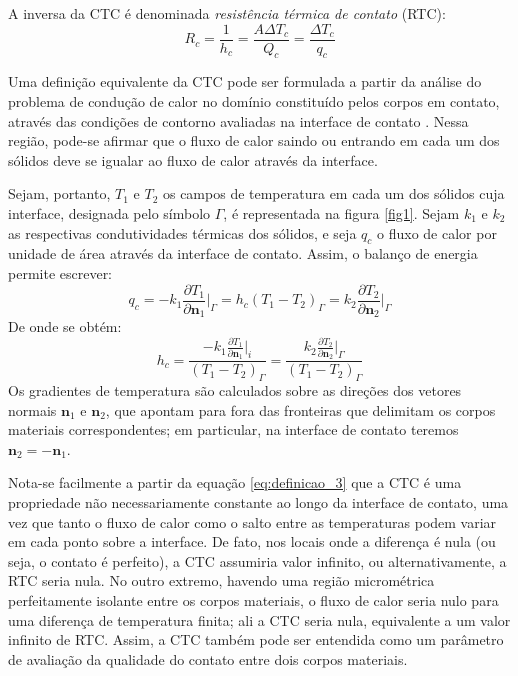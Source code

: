 A inversa da CTC é denominada \textit{resistência térmica de contato} (RTC):
\begin{equation}
	R_c = \frac{1}{h_c} = \frac{A\Delta T_c}{Q_c} = \frac{\Delta T_c}{q_c}
\end{equation}

Uma definição equivalente da CTC pode ser formulada a partir da análise do problema de condução de calor no domínio constituído pelos
corpos em contato, através das condições de contorno avaliadas na interface de contato \citep{livro_ozisik}. Nessa região, pode-se afirmar que o fluxo
de calor saindo ou entrando em cada um dos sólidos deve se igualar ao fluxo de calor através da interface.

Sejam, portanto, $T_1$ e $T_2$ os campos de temperatura em cada um dos sólidos cuja interface, designada pelo símbolo $\Gamma$, é representada na figura \ref{fig1}. Sejam $k_1$ e $k_2$
as respectivas condutividades térmicas dos sólidos, e seja $q_c$ o fluxo de calor por unidade de área através da interface de contato. Assim, o balanço de energia permite escrever:
\begin{equation}
	q_c = -k_1\frac{\partial T_1}{\partial \mathbf{n}_1}\bigg|_\Gamma
	=
	h_c(T_1 - T_2)_\Gamma
	=
	k_2\frac{\partial T_2}{\partial \mathbf{n}_2}\bigg|_\Gamma \label{eq:definicao_2}
\end{equation}
De onde se obtém:
\begin{equation}
	h_c = \frac{-k_1\displaystyle\frac{\partial T_1}{\partial \mathbf{n}_1}\bigg|_i}{(T_1 - T_2)_\Gamma} = \frac{k_2\displaystyle\frac{\partial T_2}{\partial \mathbf{n}_2}\bigg|_\Gamma}{(T_1 - T_2)_\Gamma} \label{eq:definicao_3}
\end{equation}
Os gradientes de temperatura são calculados sobre as direções dos vetores normais
$\mathbf{n}_1$ e $\mathbf{n}_2$, que apontam para fora das fronteiras que delimitam os corpos materiais correspondentes; em particular,
na interface de contato teremos $\mathbf{n}_2 = -\mathbf{n}_1$.

Nota-se facilmente a partir da equação \eqref{eq:definicao_3} que a CTC é uma propriedade não necessariamente constante ao longo da interface de contato,
uma vez que tanto o fluxo de calor como o salto entre as temperaturas podem variar em cada ponto sobre a interface. De fato, nos locais onde a diferença é nula (ou seja, o contato
é perfeito), a CTC assumiria valor infinito, ou alternativamente, a RTC seria nula. No outro extremo, havendo uma região micrométrica perfeitamente
isolante entre os corpos materiais, o fluxo de calor seria nulo para uma diferença de temperatura finita; ali a CTC seria nula, equivalente a um valor
infinito de RTC. Assim, a CTC também pode ser entendida como um parâmetro de avaliação da qualidade do contato entre dois corpos materiais.

